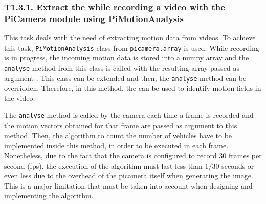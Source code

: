 

\subsubsection{T1.3.1. Extract the  while recording a video with the PiCamera module using PiMotionAnalysis}

This task deals with the need of extracting motion data from videos. To achieve this task, \texttt{PiMotionAnalysis} class from \texttt{picamera.array} is used. While recording is in progress, the incoming motion data is stored into a numpy array and the \texttt{analyse} method from this class is called with the resulting array passed as argument \cite{PiCameraDoc}. This class can be extended and then, the \texttt{analyse} method can be overridden. Therefore, in this method, the  can be used to identify motion fields in the video.

The \texttt{analyse} method is called by the camera each time a frame is recorded and the motion vectors obtained for that frame are passed as argument to this method. Then, the algorithm to count the number of vehicles have to be implemented inside this method, in order to be executed in each frame. Nonetheless, due to the fact that the camera is configured to record 30 frames per second (fps), the execution of the algorithm must last less than $1/30$ seconds or even less due to the overhead of the picamera itself when generating the image. This is a major limitation that must be taken into account when designing and implementing the algorithm.

